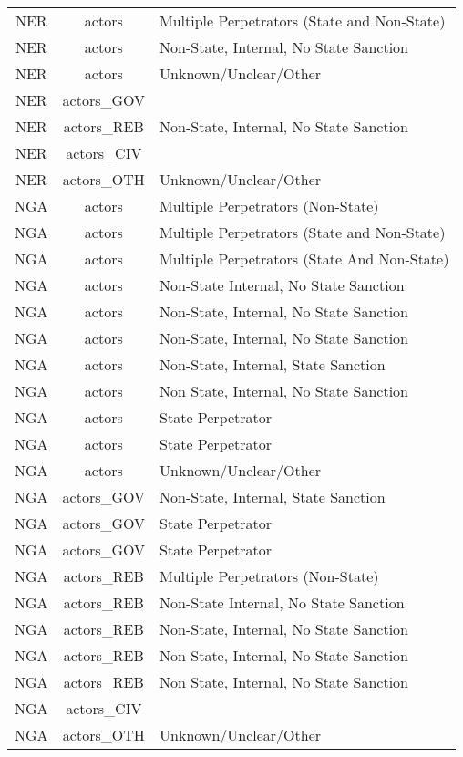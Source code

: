 \documentclass[12pt]{article}
\begin{document}
\begin{center}
\begin{longtable}{|c|c|p{10cm}|}
  NER & actors & Multiple Perpetrators (State and Non-State) \\ 
  NER & actors & Non-State, Internal, No State Sanction \\ 
  NER & actors & Unknown/Unclear/Other \\ 
  NER & actors\_GOV &  \\ 
  NER & actors\_REB & Non-State, Internal, No State Sanction \\ 
  NER & actors\_CIV &  \\ 
  NER & actors\_OTH & Unknown/Unclear/Other \\ 
  NGA & actors & Multiple Perpetrators (Non-State) \\ 
  NGA & actors & Multiple Perpetrators (State and Non-State) \\ 
  NGA & actors & Multiple Perpetrators (State And Non-State) \\ 
  NGA & actors & Non-State Internal, No State Sanction \\ 
  NGA & actors & Non-State, Internal, No State Sanction \\ 
  NGA & actors & Non-State, Internal, No State Sanction \\ 
  NGA & actors & Non-State, Internal, State Sanction \\ 
  NGA & actors & Non State, Internal, No State Sanction \\ 
  NGA & actors & State Perpetrator \\ 
  NGA & actors & State Perpetrator \\ 
  NGA & actors & Unknown/Unclear/Other \\ 
  NGA & actors\_GOV & Non-State, Internal, State Sanction \\ 
  NGA & actors\_GOV & State Perpetrator \\ 
  NGA & actors\_GOV & State Perpetrator \\ 
  NGA & actors\_REB & Multiple Perpetrators (Non-State) \\ 
  NGA & actors\_REB & Non-State Internal, No State Sanction \\ 
  NGA & actors\_REB & Non-State, Internal, No State Sanction \\ 
  NGA & actors\_REB & Non-State, Internal, No State Sanction \\ 
  NGA & actors\_REB & Non State, Internal, No State Sanction \\ 
  NGA & actors\_CIV &  \\ 
  NGA & actors\_OTH & Unknown/Unclear/Other \\ 

\end{longtable}
\end{center}
\end{document}
